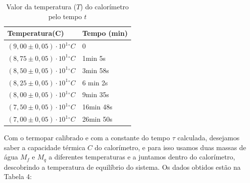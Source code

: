 \documentclass[a4paper]{article}
\begin{document}
\begin{table}[H]
	\begin{center}
	\caption{Valor da temperatura ($T$) do calorímetro pelo tempo $t$}
    \begin{tabular}{|l|l|}
    \hline
    Temperatura(C) & Tempo (min) \\ \hline
    $(9,00\pm0,05)\cdot10^{1}\unit{^{\circ}C}$              & 0           \\ \hline
    $(8,75\pm0,05)\cdot10^{1}\unit{^{\circ}C}$            & 1min 5s     \\ \hline
    $(8,50\pm0,05)\cdot10^{1}\unit{^{\circ}C}$              & 3min 58s    \\ \hline
    $(8,25\pm0,05)\cdot10^{1}\unit{^{\circ}C}$            & 6 min 2s    \\ \hline
    $(8,00\pm0,05)\cdot10^{1}\unit{^{\circ}C}$              & 9min 35s    \\ \hline
    $(7,50\pm0,05)\cdot10^{1}\unit{^{\circ}C}$             & 16min 48s   \\ \hline
    $(7,00\pm0,05)\cdot10^{1}\unit{^{\circ}C}$             & 26min 50s   \\ \hline
    \end{tabular}
    \end{center}
\end{table}

	Com o termopar calibrado e com a constante do tempo $\tau$ calculada, desejamos saber a capacidade térmica $C$ do calorímetro, e para isso usamos duas massas de água $M_{f}$ e $M_{q}$ a diferentes temperaturas e a juntamos dentro do calorímetro, descobrindo a temperatura de equilíbrio do sistema. Os dados obtidos estão na Tabela 4:
\end{document}
